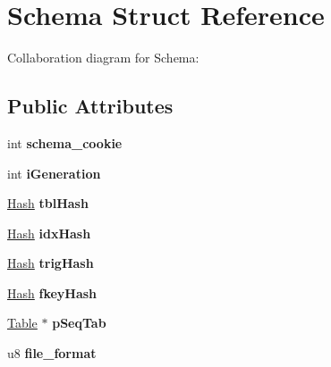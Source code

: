 \hypertarget{structSchema}{}\section{Schema Struct Reference}
\label{structSchema}


Collaboration diagram for Schema\+:
\subsection*{Public Attributes}
\begin{DoxyCompactItemize}
\item 
int {\bfseries schema\+\_\+cookie}\hypertarget{structSchema_a3eef54a64f4f962d64577646bd34a47c}{}\label{structSchema_a3eef54a64f4f962d64577646bd34a47c}

\item 
int {\bfseries i\+Generation}\hypertarget{structSchema_a879b1597656c7cbcbb98cdb88e876874}{}\label{structSchema_a879b1597656c7cbcbb98cdb88e876874}

\item 
\hyperlink{structHash}{Hash} {\bfseries tbl\+Hash}\hypertarget{structSchema_af841eadc93b289944b95f72b784bfaae}{}\label{structSchema_af841eadc93b289944b95f72b784bfaae}

\item 
\hyperlink{structHash}{Hash} {\bfseries idx\+Hash}\hypertarget{structSchema_ac0dd242f486d17ddadca1e47af76c6c5}{}\label{structSchema_ac0dd242f486d17ddadca1e47af76c6c5}

\item 
\hyperlink{structHash}{Hash} {\bfseries trig\+Hash}\hypertarget{structSchema_ab521f4545d200329d8e1a46bbb67e7c5}{}\label{structSchema_ab521f4545d200329d8e1a46bbb67e7c5}

\item 
\hyperlink{structHash}{Hash} {\bfseries fkey\+Hash}\hypertarget{structSchema_ad51ed96351701cfe8d9e871722827c11}{}\label{structSchema_ad51ed96351701cfe8d9e871722827c11}

\item 
\hyperlink{structTable}{Table} $\ast$ {\bfseries p\+Seq\+Tab}\hypertarget{structSchema_ad580e4e662724bee95571d297f94da37}{}\label{structSchema_ad580e4e662724bee95571d297f94da37}

\item 
u8 {\bfseries file\+\_\+format}\hypertarget{structSchema_ab9f0371436e41b3080772995407a4cca}{}\label{structSchema_ab9f0371436e41b3080772995407a4cca}


\end{DoxyCompactItemize}
